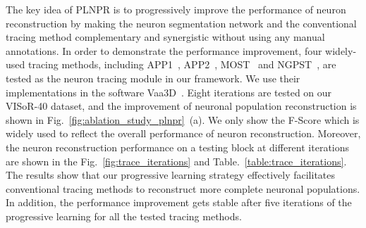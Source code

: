 The key idea of PLNPR is to progressively improve the performance of neuron reconstruction by making the neuron segmentation network and the conventional tracing method complementary and synergistic without using any manual annotations.
In order to demonstrate the performance improvement, four widely-used tracing methods, including APP1~\cite{Peng2011}, APP2~\cite{Xiao2013}, MOST~\cite{Wu2014} and NGPST~\cite{Quan2015}, are tested as the neuron tracing module in our framework. 
We use their implementations in the software Vaa3D~\cite{Peng2014}. 
%
Eight iterations are tested on our VISoR-40 dataset, and the improvement of neuronal population reconstruction is shown in Fig.~\ref{fig:ablation_study_plnpr}~(a).
We only show the F-Score which is widely used to reflect the overall performance of neuron reconstruction.
%
Moreover, the neuron reconstruction performance on a testing block at different iterations are shown in the Fig.~\ref{fig:trace_iterations} and Table.~\ref{table:trace_iterations}.
%
The results show that our progressive learning strategy effectively facilitates conventional tracing methods to reconstruct more complete neuronal populations.
In addition, the performance improvement gets stable after five iterations of the progressive learning for all the tested tracing methods. 

 

